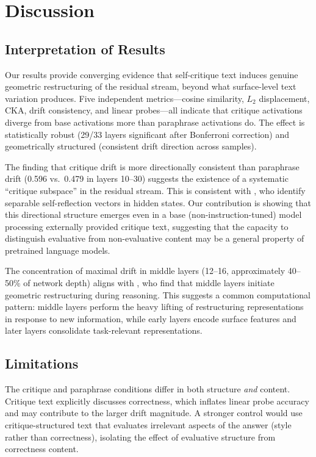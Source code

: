 \section{Discussion}
\label{sec:discussion}

\subsection{Interpretation of Results}

Our results provide converging evidence that self-critique text induces genuine geometric restructuring of the residual stream, beyond what surface-level text variation produces. Five independent metrics---cosine similarity, $L_2$ displacement, CKA, drift consistency, and linear probes---all indicate that critique activations diverge from base activations more than paraphrase activations do. The effect is statistically robust (29/33 layers significant after Bonferroni correction) and geometrically structured (consistent drift direction across samples).

The finding that critique drift is more directionally consistent than paraphrase drift (0.596 vs.\ 0.479 in layers 10--30) suggests the existence of a systematic ``critique subspace'' in the residual stream. This is consistent with \citet{zhu2025emergence}, who identify separable self-reflection vectors in hidden states. Our contribution is showing that this directional structure emerges even in a base (non-instruction-tuned) model processing externally provided critique text, suggesting that the capacity to distinguish evaluative from non-evaluative content may be a general property of pretrained language models.

The concentration of maximal drift in middle layers (12--16, approximately 40--50\% of network depth) aligns with \citet{polo2026emergent}, who find that middle layers initiate geometric restructuring during reasoning. This suggests a common computational pattern: middle layers perform the heavy lifting of restructuring representations in response to new information, while early layers encode surface features and later layers consolidate task-relevant representations.

\subsection{Limitations}

The critique and paraphrase conditions differ in both structure \emph{and} content. Critique text explicitly discusses correctness, which inflates linear probe accuracy and may contribute to the larger drift magnitude. A stronger control would use critique-structured text that evaluates irrelevant aspects of the answer (\eg style rather than correctness), isolating the effect of evaluative structure from correctness content.


